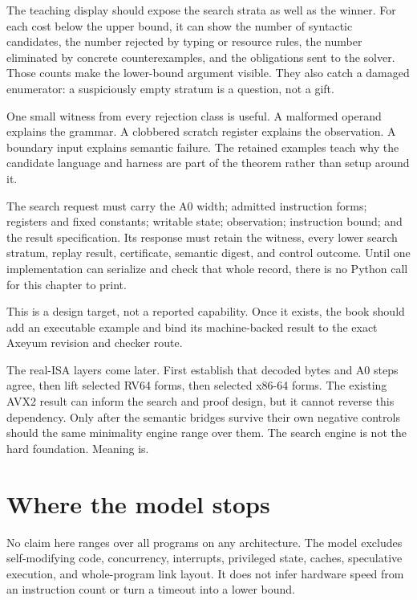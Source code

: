 The teaching display should expose the search strata as well as the winner.
For each cost below the upper bound, it can show the number of syntactic
candidates, the number rejected by typing or resource rules, the number
eliminated by concrete counterexamples, and the obligations sent to the
solver. Those counts make the lower-bound argument visible. They also catch a
damaged enumerator: a suspiciously empty stratum is a question, not a gift.

One small witness from every rejection class is useful. A malformed operand
explains the grammar. A clobbered scratch register explains the observation.
A boundary input explains semantic failure. The retained examples teach why
the candidate language and harness are part of the theorem rather than setup
around it.

\begin{keyidea}[title={Contract for the future teaching interface}]
The search request must carry the A0 width; admitted instruction forms;
registers and fixed constants; writable state; observation; instruction bound;
and the result specification. Its response must retain the witness, every
lower search stratum, replay result, certificate, semantic digest, and control
outcome. Until one implementation can serialize and check that whole record,
there is no Python call for this chapter to print.
\end{keyidea}

This is a design target, not a reported capability. Once it exists, the book
should add an executable example and bind its machine-backed result to the
exact Axeyum revision and checker route.

The real-ISA layers come later. First establish that decoded bytes and A0
steps agree, then lift selected RV64 forms, then selected x86-64 forms. The
existing AVX2 result can inform the search and proof design, but it cannot
reverse this dependency. Only after the semantic bridges survive their own
negative controls should the same minimality engine range over them. The
search engine is not the hard foundation. Meaning is.

\section{Where the model stops}

No claim here ranges over all programs on any architecture. The model excludes
self-modifying code, concurrency, interrupts, privileged state, caches,
speculative execution, and whole-program link layout. It does not infer
hardware speed from an instruction count or turn a timeout into a lower bound.

